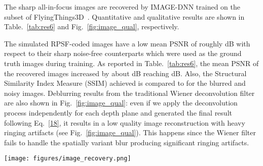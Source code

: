 \documentclass[preprint,5p,twocolumn]{elsarticle}
\begin{document}
The sharp all-in-focus images are recovered by IMAGE-DNN trained on the subset of FlyingThings3D~\cite{MIFDB16}. Quantitative and qualitative results are shown in Table.~\ref{tab:res6} and Fig.~\ref{fig:image_qual}, respectively. 

The simulated RPSF-coded images have a low mean PSNR of roughly  dB with respect to their sharp noise-free counterparts which were used as the ground truth images during training. As reported in Table.~\ref{tab:res6}, the mean PSNR of the recovered images increased by about  dB reaching  dB. Also, the Structural Similarity Index Measure (SSIM) achieved is  compared  to  for the blurred and noisy images. Deblurring results from the traditional Wiener deconvolution filter~\cite{wiener1964extrapolation} are also shown in Fig.~\ref{fig:image_qual}: even if we apply the deconvolution process independently for each depth plane and generated the final result following Eq.~\ref{18}, it results in a low quality image reconstruction with heavy ringing artifacts (see Fig.~\ref{fig:image_qual}).
This happens since the Wiener filter fails to handle the spatially variant blur producing significant ringing artifacts. 

\begin{table}[h!]
\begin{center}
\end{center}
\centering
\caption{Quantitative results of the image deblurring model on the test set of FlyingThings3D~\cite{MIFDB16} subset.}
\label{tab:res6}
\end{table}

\begin{figure*}[h!]
\centering
\texttt{[image: figures/image\_recovery.png]}
\caption{Qualitative results of the image deblurring model on the test set of FlyingThings3D~\cite{MIFDB16} subset.}
\label{fig:image_qual}
\end{figure*}
\end{document}
